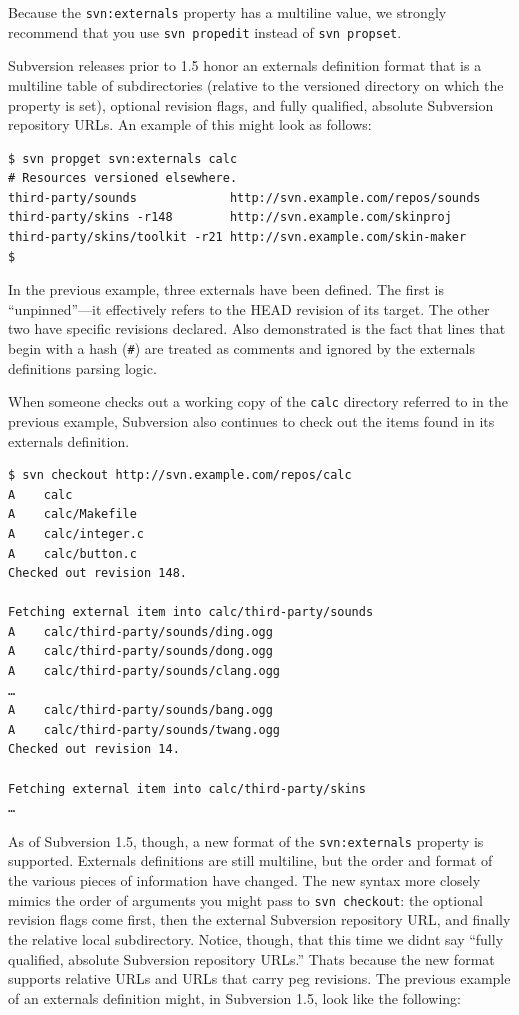 Because the \texttt{svn:externals} property has a multiline value, we
strongly recommend that you use \texttt{svn\ propedit} instead of
\texttt{svn\ propset}.

Subversion releases prior to 1.5 honor an externals definition format
that is a multiline table of subdirectories (relative to the versioned
directory on which the property is set), optional revision flags, and
fully qualified, absolute Subversion repository URLs. An example of this
might look as follows:

\begin{verbatim}
$ svn propget svn:externals calc
# Resources versioned elsewhere.
third-party/sounds             http://svn.example.com/repos/sounds
third-party/skins -r148        http://svn.example.com/skinproj
third-party/skins/toolkit -r21 http://svn.example.com/skin-maker
$
\end{verbatim}

In the previous example, three externals have been defined. The first is
``unpinned''---it effectively refers to the HEAD revision of its target.
The other two have specific revisions declared. Also demonstrated is the
fact that lines that begin with a hash (\texttt{\#}) are treated as
comments and ignored by the externals definitions parsing logic.

When someone checks out a working copy of the \texttt{calc} directory
referred to in the previous example, Subversion also continues to check
out the items found in its externals definition.

\begin{verbatim}
$ svn checkout http://svn.example.com/repos/calc
A    calc
A    calc/Makefile
A    calc/integer.c
A    calc/button.c
Checked out revision 148.

Fetching external item into calc/third-party/sounds
A    calc/third-party/sounds/ding.ogg
A    calc/third-party/sounds/dong.ogg
A    calc/third-party/sounds/clang.ogg
…
A    calc/third-party/sounds/bang.ogg
A    calc/third-party/sounds/twang.ogg
Checked out revision 14.

Fetching external item into calc/third-party/skins
…
\end{verbatim}

As of Subversion 1.5, though, a new format of the \texttt{svn:externals}
property is supported. Externals definitions are still multiline, but
the order and format of the various pieces of information have changed.
The new syntax more closely mimics the order of arguments you might pass
to \texttt{svn\ checkout}: the optional revision flags come first, then
the external Subversion repository URL, and finally the relative local
subdirectory. Notice, though, that this time we didn\textquotesingle t
say ``fully qualified, absolute Subversion repository URLs.''
That\textquotesingle s because the new format supports relative URLs and
URLs that carry peg revisions. The previous example of an externals
definition might, in Subversion 1.5, look like the following:

